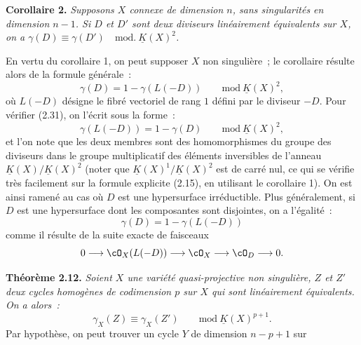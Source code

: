 \textbf{Corollaire 2.} \emph{Supposons $X$ connexe de dimension $n$, sans singularités en dimension $n-1$. Si $D$ et $D'$ sont deux diviseurs linéairement équivalents sur $X$, on a $\gamma(D)\equiv\gamma(D')\quad\mathrm{mod.}\ \underline K(X)^2$.}

En vertu du corollaire 1, on peut supposer $X$ non singulière~; le corollaire résulte alors de la formule générale~:
\begin{equation}\tag{2.31}
 \gamma(D)=1-\gamma(L(-D))\qquad\mathrm{mod}\ \underline K(X)^2,
\end{equation}
où $L(-D)$ désigne le fibré vectoriel de rang $1$ défini par le diviseur $-D$. Pour vérifier (2.31), on l'écrit sous la forme~:
\begin{equation}\tag{2.31 bis}
 \gamma(L(-D))=1-\gamma(D)\qquad\mathrm{mod}\ \underline K(X)^2,
\end{equation}
et l'on note que les deux membres sont des homomorphismes du groupe des diviseurs dans le groupe multiplicatif des éléments inversibles de l'anneau $\underline K(X)/\underline K(X)^2$ (noter que $\underline K(X)^1/\underline K(X)^2$ est de carré nul, ce qui se vérifie très facilement sur la formule explicite (2.15), en utilisant le corollaire 1). On est ainsi ramené au cas où $D$ est une hypersurface irréductible. Plus généralement, si $D$ est une hypersurface dont les composantes sont disjointes, on a l'égalité~:
\begin{equation}\tag{2.32}
 \gamma(D)=1-\gamma(L(-D))
\end{equation}
comme il résulte de la suite exacte de faisceaux
\[
0\longrightarrow\cO_X(L(-D))\longrightarrow\cO_X\longrightarrow\cO_D\longrightarrow0.
\]

\textbf{Théorème 2.12.} \emph{Soient $X$ une variété quasi-projective non singulière, $Z$ et $Z'$ deux cycles homogènes de codimension $p$ sur $X$ qui sont linéairement équivalents. On a alors~:}
\begin{equation}\tag{2.33}
 \gamma_X(Z)\equiv\gamma_X(Z')\qquad\mathrm{mod}\ \underline K(X)^{p+1}.
\end{equation}
Par hypothèse, on peut trouver un cycle $Y$ de dimension $n-p+1$ sur 
